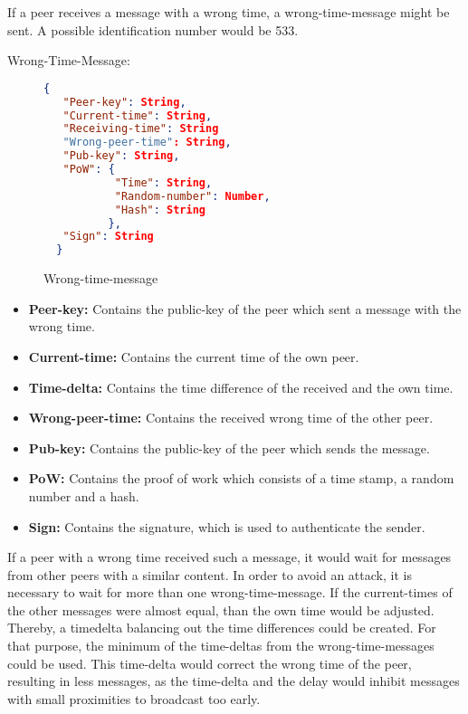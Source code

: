 \documentclass[IN,11pt,oneside,openright,english]{article}
\begin{document}
If a peer receives a message with a wrong time, a wrong-time-message might be sent. A possible identification number would be 533.
\newline


Wrong-Time-Message:

\begin{figure}[!h]
  \centering
  \begin{lstlisting}[language=json,firstnumber=1]
  {
   "Peer-key": String,
   "Current-time": String,
   "Receiving-time": String
   "Wrong-peer-time": String,
   "Pub-key": String,
   "PoW": {
           "Time": String,
           "Random-number": Number,
           "Hash": String
          },
   "Sign": String
  }
  \end{lstlisting}
\caption{Wrong-time-message}
\end{figure}

\begin{itemize}
\item \textbf{Peer-key:} Contains the public-key of the peer which sent a message with the wrong time.
\item \textbf{Current-time:} Contains the current time of the own peer.
\item \textbf{Time-delta:} Contains the time difference of the received and the own time. 
\item \textbf{Wrong-peer-time:} Contains the received wrong time of the other peer.
\item \textbf{Pub-key:} Contains the public-key of the peer which sends the message.
\item \textbf{PoW:} Contains the proof of work which consists of a time stamp, a random number and a hash.
\item \textbf{Sign:} Contains the signature, which is used to authenticate the sender.
\end{itemize}

If a peer with a wrong time received such a message, it would wait for messages from other peers with a similar content. In order to avoid an attack, it is necessary to wait for more than one wrong-time-message. If the current-times of the other messages were almost equal, than the own time would be adjusted.\newline
Thereby, a timedelta balancing out the time differences could be created. For that purpose, the minimum of the time-deltas from the wrong-time-messages could be used. This time-delta would correct the wrong time of the peer, resulting in less messages, as the time-delta and the delay would inhibit messages with small proximities to broadcast too early. 
\end{document}
